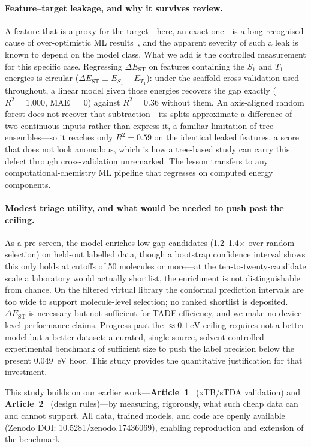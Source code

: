 \paragraph{Feature--target leakage, and why it survives review.}
A feature that is a proxy for the target---here, an exact one---is a long-recognised
cause of over-optimistic ML results~\cite{Kaufman2012,Kapoor2023,Artrith2021}, and the
apparent severity of such a leak is known to depend on the model class. What we add is
the controlled measurement for this specific case.
Regressing $\Delta E_\text{ST}$ on features containing the $S_1$ and $T_1$ energies is
circular ($\Delta E_\text{ST} \equiv E_{S_1} - E_{T_1}$): under the scaffold
cross-validation used throughout, a linear model given those energies recovers the gap
exactly ($R^2 = 1.000$, MAE $= 0$) against $R^2 = 0.36$ without them. An axis-aligned
random forest does not recover that subtraction---its splits approximate a difference
of two continuous inputs rather than express it, a familiar limitation of tree
ensembles---so it reaches only $R^2 = 0.59$ on the identical leaked features, a score
that does not look anomalous, which is how a tree-based study can carry this defect
through cross-validation unremarked. The lesson
transfers to any computational-chemistry ML pipeline that regresses on computed energy
components.

\paragraph{Modest triage utility, and what would be needed to push past the ceiling.}
As a pre-screen, the model enriches low-gap candidates
(\numrange{1.2}{1.4}$\times$ over random selection) on held-out labelled data, though
a bootstrap confidence interval shows this only holds at cutoffs of \num{50}
molecules or more---at the ten-to-twenty-candidate scale a laboratory would actually
shortlist, the enrichment is not distinguishable from chance. On
the filtered virtual library the conformal prediction intervals are too wide to support
molecule-level selection; no ranked shortlist is deposited. $\Delta E_\text{ST}$ is
necessary but not sufficient for TADF efficiency, and we make no device-level
performance claims. Progress past the $\approx\qty{0.1}{\electronvolt}$ ceiling requires
not a better model but a better dataset: a curated, single-source, solvent-controlled
experimental benchmark of sufficient size to push the label precision below the present
\qty{0.049}{\electronvolt} floor. This study provides the quantitative justification
for that investment.

This study builds on our earlier work---\textbf{Article~1}~\cite{Tchapet2024_xTB}
(xTB/sTDA validation) and \textbf{Article~2}~\cite{Tchapet2024_DataDriven} (design
rules)---by measuring, rigorously, what such cheap data can and cannot support.
All data, trained models, and code are openly available (Zenodo DOI:
10.5281/zenodo.17436069), enabling reproduction and extension of the benchmark.
